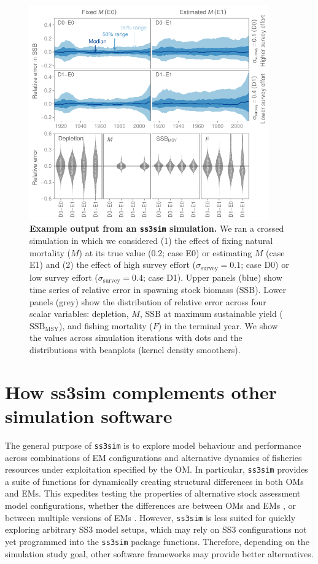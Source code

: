 \documentclass[11pt]{article}
\begin{document}
\begin{figure}[htb]
\begin{center}
\includegraphics[width=4.06in]{fig2-20131109.pdf}
\end{center}
\caption{
{\bf Example output from an \texttt{ss3sim} simulation.}
We ran a crossed simulation in which we considered
(1) the effect of fixing natural mortality ($M$)
at its true value (0.2; case E0) or estimating $M$ (case E1) and
(2) the effect of high survey effort
($\sigma_\mathrm{survey} = 0.1$; case D0)
or low survey effort ($\sigma_\mathrm{survey} = 0.4$; case D1).
Upper panels (blue) show time series of relative error
in spawning stock biomass (SSB).
Lower panels (grey) show the distribution
of relative error across four scalar variables:
depletion, $M$, SSB at maximum sustainable yield ($\mathrm{SSB}_\mathrm{MSY}$),
and fishing mortality ($F$) in the terminal year.
We show the values across simulation iterations with dots
and the distributions with beanplots (kernel density smoothers).
}
\label{fig:results}
\end{figure}

\section*{How ss3sim complements other simulation software}

The general purpose of \texttt{ss3sim} is to explore model behaviour and performance across combinations of EM configurations and alternative dynamics of fisheries resources under exploitation specified by the OM. In particular, \texttt{ss3sim} provides a suite of functions for dynamically creating structural differences in both OMs and EMs. This expedites testing the properties of alternative stock assessment model configurations, whether the differences are between OMs and EMs \cite{johnson2013}, or between multiple versions of EMs \cite{ono2013}. However, \texttt{ss3sim} is less suited for quickly exploring arbitrary SS3 model setups, which may rely on SS3 configurations not yet programmed into the \texttt{ss3sim} package functions. Therefore, depending on the simulation study goal, other software frameworks may provide better alternatives.
\end{document}
